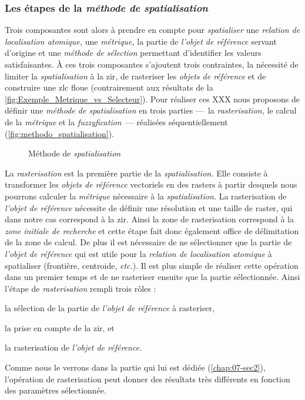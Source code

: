 \subsubsection{Les étapes de la \emph{méthode de spatialisation}}

Trois composantes sont alors à prendre en compte pour
\emph{spatialiser} une \emph{relation de localisation atomique,} une
\emph{métrique,} la partie de \emph{l'objet de référence} servant
d'origine et une \emph{méthode de sélection} permettant d'identifier
les valeurs satisfaisantes.
%
À ces trois composantes s'ajoutent trois contraintes, la nécessité de
limiter la \emph{spatialisation} à la \ac{zir}, de rasteriser les
\emph{objets de référence} et de construire une \ac{zlc} floue
(contrairement aux résultats de la
\autoref{fig:Exemple_Metrique_vs_Selecteur}).
%
Pour réaliser ces XXX nous proposons de définir une \emph{méthode de
  spatialisation} en trois parties ---~la \emph{rasterisation,} le
calcul de la \emph{métrique} et la \emph{fuzzyfication}~--- réalisées
séquentiellement (\autoref{fig:methodo_spatialisation}).

\begin{figure}
  \centering
  
  \caption{Méthode de \emph{spatialisation}}
  \label{fig:methodo_spatialisation}
\end{figure}

La \emph{rasterisation} est la première partie de la
\emph{spatialisation.} Elle consiste à transformer les \emph{objets de
  référence} vectoriels en des rasters à partir desquels nous pourrons
calculer la \emph{métrique} nécessaire à la \emph{spatialisation.} La
rasterisation de \emph{l'objet de référence} nécessite de définir une
résolution et une taille de raster, qui dans notre cas correspond à la
\ac{zir}. Ainsi la zone de rasterisation correspond à la \emph{zone
  initiale de recherche} et cette étape fait donc également office de
délimitation de la zone de calcul. De plus il est nécessaire de ne
sélectionner que la partie de \emph{l'objet de référence} qui est
utile pour la \emph{relation de localisation atomique} à spatialiser
(\eg frontière, centroide, \emph{etc.}). Il est plus simple de
réaliser cette opération dans un premier temps et de ne rasteriser
ensuite que la partie sélectionnée. Ainsi l'étape de
\emph{rasterisation} rempli trois rôles :
%
\begin{enumerate*}[label=(\alph*)]
\item la sélection de la partie de \emph{l'objet de référence} à rasteriser,
\item la prise en compte de la \ac{zir}, et
\item la rasterisation de \emph{l'objet de référence.}  
\end{enumerate*}
%
Comme nous le verrons dans la partie qui lui est dédiée
(\autoref{chap:07-sec2}), l'opération de rasterisation peut donner des
résultats très différents en fonction des paramètres sélectionnée.


